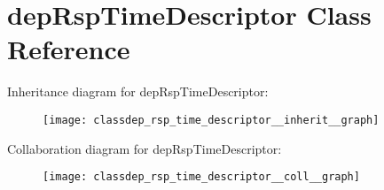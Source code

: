 \hypertarget{classdep_rsp_time_descriptor}{}\section{dep\+Rsp\+Time\+Descriptor Class Reference}
\label{classdep_rsp_time_descriptor}


Inheritance diagram for dep\+Rsp\+Time\+Descriptor\+:
\nopagebreak
\begin{figure}[H]
\begin{center}
\leavevmode
\texttt{[image: classdep\_rsp\_time\_descriptor\_\_inherit\_\_graph]}
\end{center}
\end{figure}


Collaboration diagram for dep\+Rsp\+Time\+Descriptor\+:
\nopagebreak
\begin{figure}[H]
\begin{center}
\leavevmode
\texttt{[image: classdep\_rsp\_time\_descriptor\_\_coll\_\_graph]}
\end{center}
\end{figure}
